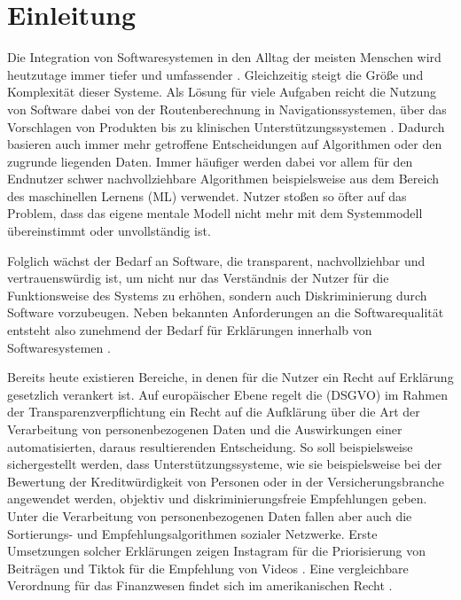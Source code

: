 \chapter{Einleitung}

Die Integration von Softwaresystemen in den Alltag der meisten Menschen wird heutzutage immer tiefer und umfassender \cite{carvalho2020developers}.  Gleichzeitig steigt die Größe und Komplexität dieser Systeme. Als Lösung für viele Aufgaben reicht die Nutzung von Software dabei von der Routenberechnung in Navigationssystemen, über das Vorschlagen von Produkten bis zu klinischen Unterstützungssystemen \cite{chazette2020explainability, tintarev2015explaining, cypko2017guide}. Dadurch basieren auch immer mehr getroffene Entscheidungen auf Algorithmen oder den zugrunde liegenden Daten. Immer häufiger werden dabei vor allem für den Endnutzer schwer nachvollziehbare Algorithmen beispielsweise aus dem Bereich des maschinellen Lernens (ML) verwendet. Nutzer stoßen so öfter auf das Problem, dass das eigene mentale Modell nicht mehr mit dem Systemmodell übereinstimmt oder unvollständig ist.

Folglich wächst der Bedarf an Software, die transparent, nachvollziehbar und vertrauenswürdig ist, um nicht nur das Verständnis der Nutzer für die Funktionsweise des Systems zu erhöhen, sondern auch Diskriminierung durch Software vorzubeugen. Neben bekannten Anforderungen an die Softwarequalität \cite{international2011iso} entsteht also zunehmend der Bedarf für Erklärungen innerhalb von Softwaresystemen \cite{chazette_end-users_nodate}.

Bereits heute existieren Bereiche, in denen für die Nutzer ein \glqq Recht auf Erklärung\grqq{} gesetzlich verankert ist. Auf europäischer Ebene regelt die  (DSGVO) \cite{eu_verordnung_2016} im Rahmen der Transparenzverpflichtung ein Recht auf die Aufklärung über die Art der Verarbeitung von personenbezogenen Daten und die Auswirkungen einer automatisierten, daraus resultierenden Entscheidung. So soll beispielsweise sichergestellt werden, dass Unterstützungssysteme, wie sie beispielsweise bei der Bewertung der Kreditwürdigkeit von Personen oder in der Versicherungsbranche angewendet werden, objektiv und diskriminierungsfreie Empfehlungen geben. Unter die Verarbeitung von personenbezogenen Daten fallen aber auch die Sortierungs- und Empfehlungsalgorithmen sozialer Netzwerke. Erste Umsetzungen solcher Erklärungen zeigen Instagram für die Priorisierung von Beiträgen und Tiktok für die Empfehlung von Videos \cite{mosseri_shedding_2021,tiktok_technology_limited_how_2021}. Eine vergleichbare Verordnung für das Finanzwesen findet sich im amerikanischen Recht \cite{cfpb_regulation_2018}.

